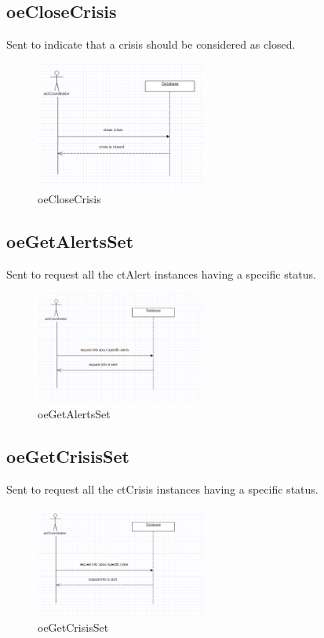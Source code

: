 \subsection{oeCloseCrisis}
Sent to indicate that a crisis should be considered as closed.

\begin{figure}[H]
\begin{center}
\includegraphics[width=0.5\textwidth]{./images/oeCloseCrisis.eps} 
\end{center}
\caption{oeCloseCrisis}
\end{figure}

\subsection{oeGetAlertsSet}
Sent to request all the ctAlert instances having a specific status.

\begin{figure}[H]
\begin{center}
\includegraphics[width=0.5\textwidth]{./images/oeGetAlertsSet.eps} 
\end{center}
\caption{oeGetAlertsSet}
\end{figure}

\subsection{oeGetCrisisSet}
Sent to request all the ctCrisis instances having a specific status.

\begin{figure}[H]
\begin{center}
\includegraphics[width=0.5\textwidth]{./images/oeGetCrisisSet.eps} 
\end{center}
\caption{oeGetCrisisSet}
\end{figure}

